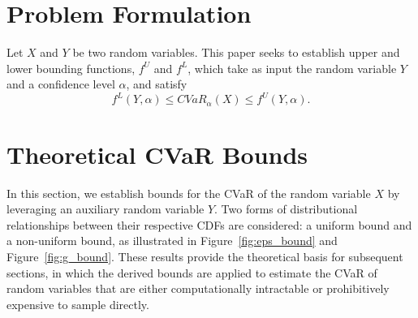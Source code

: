 \documentclass[letterpaper]{article} %
\begin{document}
\section{Problem Formulation}
Let $X$ and $Y$ be two random variables. This paper seeks to establish upper and lower bounding functions, $f^U$ and $f^L$, which take as input the random variable $Y$ and a confidence level $\alpha$, and satisfy
\begin{equation}
	f^L(Y, \alpha)\leq CVaR_\alpha(X) \leq f^U(Y,\alpha).
\end{equation} 

\section{Theoretical CVaR Bounds}
\addtocounter{section}{1}
In this section, we establish bounds for the CVaR of the random variable $X$ by leveraging an auxiliary random variable $Y$. Two forms of distributional relationships between their respective CDFs are considered: a uniform bound and a non-uniform bound, as illustrated in Figure~\ref{fig:eps_bound} and Figure~\ref{fig:g_bound}. These results provide the theoretical basis for subsequent sections, in which the derived bounds are applied to estimate the CVaR of random variables that are either computationally intractable or prohibitively expensive to sample directly.
\end{document}
